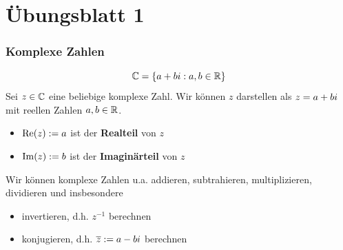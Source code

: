 \documentclass{beamer}
\begin{document}


\section{Übungsblatt 1}

\begin{frame} \frametitle{Komplexe Zahlen}
	\begin{equation*}
		\mathbb{C} = \left\{ a + bi : a,b \in \mathbb{R} \right\}
	\end{equation*}
Sei $z \in \mathbb{C}$ eine beliebige komplexe Zahl. Wir können $z$ darstellen als $z = a + bi$ mit reellen Zahlen $a,b \in \mathbb{R}$.
\begin{itemize}
	\item $\operatorname{Re}(z) \mathrel{:=} a$ ist der \textbf{Realteil} von $z$
	\item $\operatorname{Im}(z) \mathrel{:=} b$ ist der \textbf{Imaginärteil} von $z$ 
\end{itemize}

Wir können komplexe Zahlen u.a. addieren, subtrahieren, multiplizieren, dividieren und insbesondere
\begin{itemize}
	\item invertieren, d.h. $z^{-1}$ berechnen
	\item konjugieren, d.h. $\overline{z} \mathrel{:=} a - bi$ berechnen
\end{itemize}

\end{frame}
\end{document}
